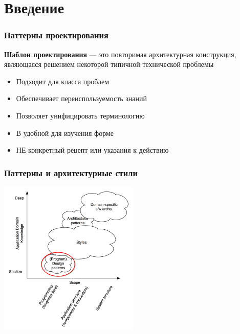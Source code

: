 \documentclass{../../slides-style}
\begin{document}
    \begin{frame}[plain]
        \titlepage
    \end{frame}

    \section{Введение}

    \begin{frame}
        \frametitle{Паттерны проектирования}
        \textbf{Шаблон проектирования} --- это повторимая архитектурная конструкция, являющаяся решением некоторой типичной технической проблемы
        \begin{itemize}
            \item Подходит для класса проблем
            \item Обеспечивает переиспользуемость знаний
            \item Позволяет унифицировать терминологию
            \item В удобной для изучения форме
            \item НЕ конкретный рецепт или указания к действию
        \end{itemize}
    \end{frame}

    \begin{frame}
        \frametitle{Паттерны и архитектурные стили}
        \begin{center}
            \includegraphics[width=0.5\textwidth]{architecturalStylesPatternsHighlighted.png}
        \end{center}
    \end{frame}
\end{document}
